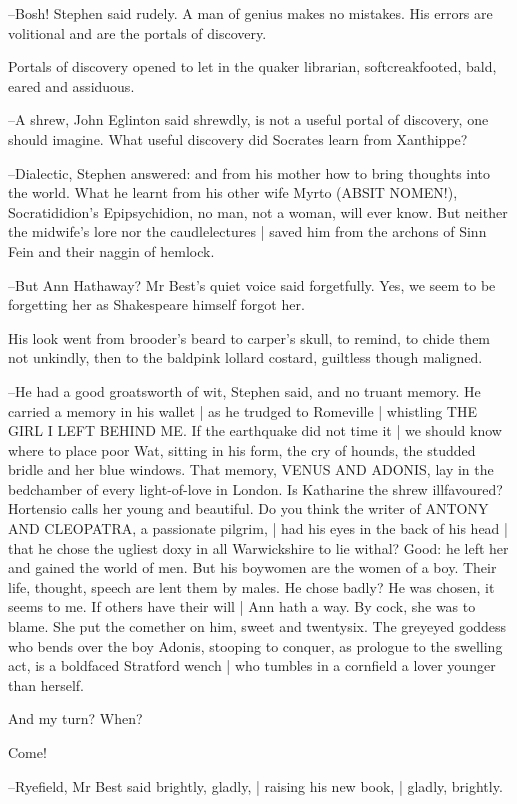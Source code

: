 --Bosh!
Stephen said rudely.
A man of genius makes no mistakes.
His errors are volitional and are the portals of discovery.

Portals of discovery opened to let in the quaker librarian,
softcreakfooted, bald, eared and assiduous.

--A shrew,
John Eglinton said shrewdly,
is not a useful portal of discovery,
one should imagine.
What useful discovery did Socrates learn from Xanthippe?

--Dialectic,
Stephen answered:
and from his mother how to bring thoughts into the world.
What he learnt from his other wife Myrto (ABSIT NOMEN!),
Socratididion's Epipsychidion,
no man, not a woman, will ever know.
But neither the midwife's lore nor the caudlelectures |
saved him from the archons of Sinn Fein and their naggin of hemlock.

--But Ann Hathaway?
Mr Best's quiet voice said forgetfully.
Yes,
we seem to be forgetting her as Shakespeare himself forgot her.

His look went from brooder's beard to carper's skull,
to remind,
to chide them not unkindly,
then to the baldpink lollard costard,
guiltless though maligned.

--He had a good groatsworth of wit,
Stephen said,
and no truant memory.
He carried a memory in his wallet |
as he trudged to Romeville |
whistling THE GIRL I LEFT BEHIND ME.
If the earthquake did not time it |
we should know where to place poor Wat,
sitting in his form,
the cry of hounds,
the studded bridle and her blue windows.
That memory,
VENUS AND ADONIS,
lay in the bedchamber of every light-of-love in London.
Is Katharine the shrew illfavoured?
Hortensio calls her young and beautiful.
Do you think the writer of ANTONY AND CLEOPATRA, a passionate pilgrim, |
had his eyes in the back of his head |
that he chose the ugliest doxy in all Warwickshire to lie withal?
Good:
he left her and gained the world of men.
But his boywomen are the women of a boy.
Their life, thought, speech are lent them by males.
He chose badly?
He was chosen, it seems to me.
If others have their will |
Ann hath a way.
By cock, she was to blame.
She put the comether on him,
sweet and twentysix.
The greyeyed goddess who bends over the boy Adonis,
stooping to conquer,
as prologue to the swelling act,
is a boldfaced Stratford wench |
who tumbles in a cornfield a lover younger than herself.

And my turn?
When?

Come!

--Ryefield,
Mr Best said brightly, gladly, |
raising his new book, |
gladly, brightly.

